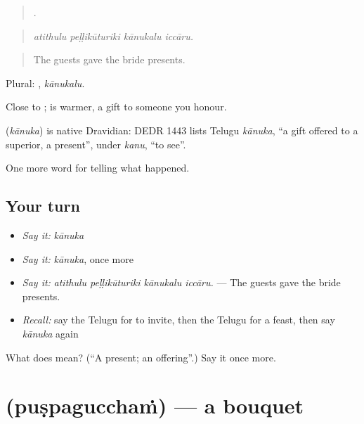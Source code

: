 \begin{quote}
   .
\end{quote}

\begin{quote}
\emph{atithulu peḷḷikūturiki kānukalu iccāru.}
\end{quote}

\begin{quote}
The guests gave the bride presents.
\end{quote}

Plural: , \emph{kānukalu}.

Close to ;  is warmer, a gift to someone you honour.

\begin{cousinweb}
\textbf{} (\emph{kānuka}) is native Dravidian: DEDR 1443 lists Telugu \emph{kānuka}, \textquotedblleft{}a gift offered to a superior, a present\textquotedblright{}, under \emph{kanu}, \textquotedblleft{}to see\textquotedblright{}.
\end{cousinweb}

\begin{grammarlens}[title={What you've built}]
One more word for telling what happened.
\end{grammarlens}

\subsection*{Your turn}
\begin{itemize}
\raggedright
  \item \emph{Say it:} \emph{kānuka}
  \item \emph{Say it:} \emph{kānuka}, once more
  \item \emph{Say it:} \emph{atithulu peḷḷikūturiki kānukalu iccāru.} — The guests gave the bride presents.
  \item \emph{Recall:} say the Telugu for to invite, then the Telugu for a feast, then say \emph{kānuka} again
\end{itemize}

\begin{tcolorbox}[breakable,colback=teal!4,colframe=teal!35!black,title={Before you move on}]
What does  mean? (\textquotedblleft{}A present; an offering\textquotedblright{}.) Say it once more.
\end{tcolorbox}
\section[\texorpdfstring{\te{పుష్పగుచ్ఛం} (puṣpagucchaṁ)}{పుష్పగుచ్ఛం (puṣpagucchaṁ)}]{ (puṣpagucchaṁ) — a bouquet}

